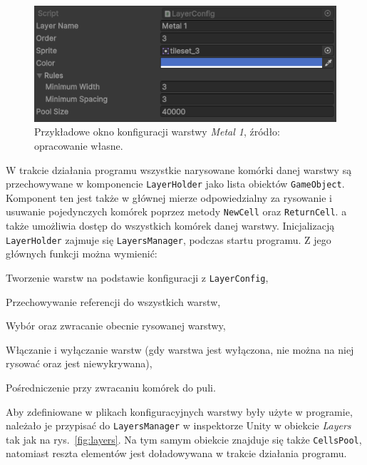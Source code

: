 \begin{figure}[h]
    \centering
    \includegraphics[width=.9\textwidth]{chapters/chapter4/rys/layer_config}
    \caption[Przykładowe okno konfiguracji warstwy \textit{Metal 1}.]
    {Przykładowe okno konfiguracji warstwy \textit{Metal 1}, źródło: opracowanie własne.}
    \label{fig:layer_config}
\end{figure}

\indent W trakcie działania programu wszystkie narysowane komórki danej warstwy
są przechowywane w komponencie \texttt{LayerHolder} jako lista obiektów \texttt{GameObject}.
Komponent ten jest także w głównej mierze odpowiedzialny za rysowanie
i usuwanie pojedynczych komórek poprzez metody \texttt{NewCell} oraz \texttt{ReturnCell}.
a także umożliwia dostęp do wszystkich komórek danej warstwy.
Inicjalizacją \texttt{LayerHolder} zajmuje się \texttt{LayersManager}, podczas startu programu.
Z jego głównych funkcji można wymienić:

\begin{citemize}
    \item Tworzenie warstw na podstawie konfiguracji z \texttt{LayerConfig},
    \item Przechowywanie referencji do wszystkich warstw,
    \item Wybór oraz zwracanie obecnie rysowanej warstwy,
    \item Włączanie i wyłączanie warstw (gdy warstwa jest wyłączona, nie można na niej rysować oraz jest niewykrywana),
    \item Pośredniczenie przy zwracaniu komórek do puli.
\end{citemize}


Aby zdefiniowane w plikach konfiguracyjnych warstwy były użyte w programie,
należało je przypisać do \texttt{LayersManager} w inspektorze Unity w obiekcie \textit{Layers} tak jak na rys.~\ref{fig:layers}.
Na tym samym obiekcie znajduje się także \texttt{CellsPool},
natomiast reszta elementów jest doładowywana w trakcie działania programu.

\newpage %


